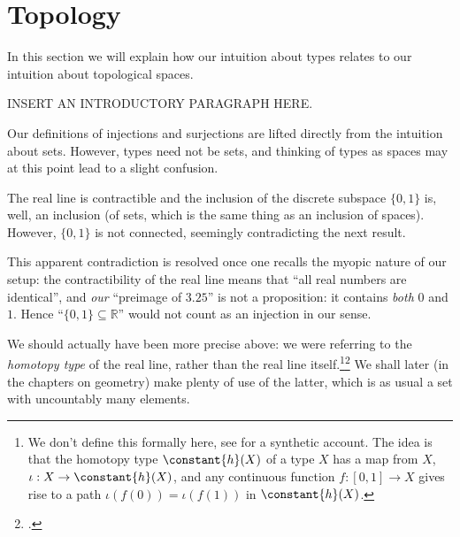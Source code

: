 \section{Topology}
\label{sec:topology}
In this section we will explain how our intuition about types relates to our intuition about topological spaces.

INSERT AN INTRODUCTORY PARAGRAPH HERE.

\begin{remark}
  \label{rem:injectionsurjectionisnotwhatyouthink}
  Our definitions of injections and surjections are lifted directly from the intuition about sets.  However, types need not be sets, and
  thinking of types as spaces may at this point lead to a slight confusion.

  The real line is contractible and the inclusion of the discrete subspace $\{0,1\}$ is, well, an inclusion (of sets, which is the same thing as
  an inclusion of spaces).  However, $\{0,1\}$ is not connected, seemingly contradicting the next result.

  This apparent contradiction is resolved once one recalls the myopic nature of our setup: the contractibility of the real line means that ``all
  real numbers are identical'', and \emph{our} ``preimage of $3{.}25$'' is not a proposition: it contains \emph{both} $0$ and $1$.  Hence
  ``$\{0,1\}\subseteq\mathbb R$'' would not count as an injection in our sense.

  We should actually have been more precise above: we were referring to the \emph{homotopy type} of the real line, rather than the real line itself.\footnote{\label{ft:cohesive}%
    We don't define this formally here,
    see \citeauthor{Shulman-Real-Cohesive}\footnotemark{} for a synthetic account.
    The idea is that the homotopy type $\constant{h}(X)$ of a type $X$
    has a map from $X$, $\iota : X \to \constant{h}(X)$,
    and any continuous function $f : [0,1] \to X$
    gives rise to a path
    $\iota(f(0)) = \iota(f(1))$ in
    $\constant{h}(X)$.}\footcitetext{Shulman-Real-Cohesive}
  We shall later (in the chapters on geometry) make plenty of use of the latter,
  which is as usual a set with uncountably many elements.
\end{remark}



